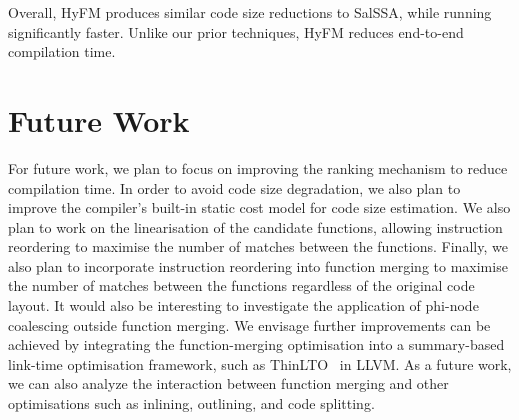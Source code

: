 Overall, HyFM produces similar code size reductions to SalSSA, while running significantly faster.
Unlike our prior techniques, HyFM reduces end-to-end compilation time.

\section{Future Work} \label{sec:conclusion:futurework}

For future work, we plan to focus on improving the ranking mechanism to reduce compilation time.
In order to avoid code size degradation, we also plan to improve the compiler's built-in static cost model for code size estimation.
We also plan to work on the linearisation of the candidate functions, allowing instruction reordering to maximise the number of matches between the functions.
Finally, we also plan to incorporate instruction reordering into function merging to maximise the number of matches between the functions regardless of the original code layout.
It would also be interesting to investigate the application of phi-node coalescing outside function merging.
We envisage further improvements can be achieved by integrating the function-merging optimisation into a summary-based  link-time optimisation framework, such as ThinLTO~\cite{johnson17} in LLVM.
As a future work, we can also analyze the interaction between function merging and other optimisations such as inlining, outlining, and code splitting.



